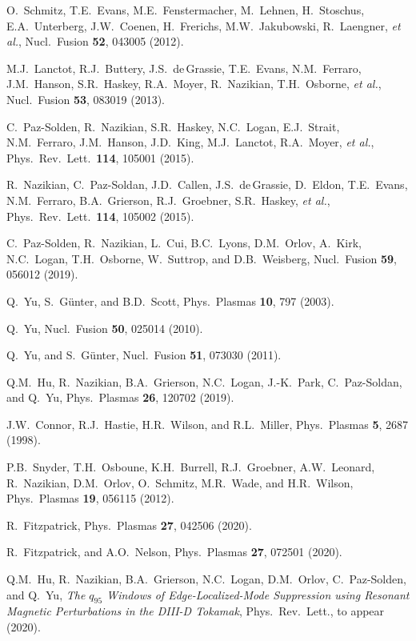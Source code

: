 \documentclass[12pt,prb,aps]{revtex4-1}
\begin{document}
\begin{thebibliography}{99}
 O.~Schmitz, T.E.~Evans, M.E.~Fenstermacher, M.~Lehnen, H.~Stoschus, E.A.~Unterberg, J.W.~Coenen, H.~Frerichs, M.W.~Jakubowski, R.~Laengner, {\em et al.}, 
Nucl.\ Fusion {\bf 52}, 043005 (2012). 

 M.J.~Lanctot, R.J.~Buttery, J.S.~de\,Grassie, T.E.~Evans, N.M.~Ferraro, J.M.~Hanson, S.R.~Haskey,  R.A.~Moyer, R.~Nazikian, T.H.~Osborne, {\em et al.}, 
Nucl.\ Fusion {\bf 53}, 083019 (2013). 

 C.~Paz-Solden, R.~Nazikian, S.R.~Haskey, N.C.~Logan, E.J.~Strait, N.M.~Ferraro, J.M.~Hanson, J.D.~King, M.J.~Lanctot, R.A.~Moyer, {\it et al.}, 
Phys.\ Rev.\ Lett.\ {\bf 114}, 105001 (2015).

 R.~Nazikian, C.~Paz-Soldan, J.D.~Callen,  J.S.~de\,Grassie, D.~Eldon, T.E.~Evans, N.M.~Ferraro,  B.A.~Grierson, R.J.~Groebner, S.R.~Haskey, {\em et al.}, 
Phys.\ Rev.\ Lett.\ {\bf 114}, 105002 (2015).

 C.~Paz-Solden, R.~Nazikian, L.~Cui, B.C.~Lyons,  D.M.~Orlov, A.~Kirk, N.C.~Logan, T.H.~Osborne, W.~Suttrop, and D.B.~Weisberg, 
Nucl.\ Fusion {\bf 59}, 056012 (2019). 

 Q.~Yu, S.~G\"{u}nter,  and B.D.~Scott, Phys.\ Plasmas {\bf 10}, 797 (2003).

 Q.~Yu, Nucl.\ Fusion {\bf 50}, 025014 (2010).

 Q.~Yu, and S.~G\"unter,  Nucl.\ Fusion {\bf 51},  073030 (2011).

 Q.M.~Hu,  R.~Nazikian,  B.A.~Grierson,  N.C.~Logan,  J.-K.~Park,  C.~Paz-Soldan, and Q.~Yu,  Phys.\ Plasmas {\bf 26}, 120702 (2019).
 
 J.W.~Connor,  R.J.~Hastie, H.R.~Wilson, and R.L.~Miller, Phys.\ Plasmas  {\bf 5}, 2687 (1998).

  P.B.~Snyder, T.H.~Osboune, K.H.~Burrell, R.J.~Groebner, A.W.~Leonard, R.~Nazikian, D.M.~Orlov, O.~Schmitz, M.R.~Wade, and H.R.~Wilson, 
 Phys.\ Plasmas {\bf 19}, 056115 (2012).

 R.~Fitzpatrick, Phys.\ Plasmas {\bf 27}, 042506 (2020).

 R.~Fitzpatrick, and A.O.~Nelson, Phys.\ Plasmas {\bf 27}, 072501 (2020).

 Q.M.~Hu, R.~Nazikian, B.A.~Grierson, N.C.~Logan, D.M.~Orlov, C.~Paz-Solden, and Q.~Yu,
{\em The $q_{95}$ Windows of Edge-Localized-Mode Suppression using Resonant Magnetic Perturbations in the DIII-D Tokamak}, 
Phys.\ Rev.\ Lett., to appear (2020).


\end{thebibliography}
\end{document}
